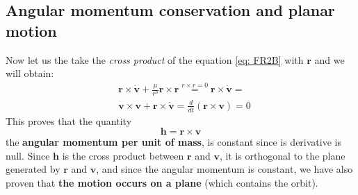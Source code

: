 \subsection{Angular momentum conservation and planar motion}
Now let us the take the \textit{cross product} of the equation \ref{eq: FR2B} with $\mathbf{r}$ and we will obtain:
{\large{
    \begin{align*}
        &\mathbf{r} \times\dot{\mathbf{v}} + 
        \frac{\mu}{r^3}\mathbf{r} \times \mathbf{r} \overset{r\times r=0}{=} 
        \mathbf{r} \times\dot{\mathbf{v}} =\\
        & \mathbf{v} \times \mathbf{v} + \mathbf{r} \times\dot{\mathbf{v}} = \frac{d}{dt} (\mathbf{r} \times\mathbf{v})=0
    \end{align*}
}}
This proves that the quantity
\begin{equation*}
    \mathbf{h} = \mathbf{r} \times\mathbf{v}
\end{equation*}
the \textbf{angular momentum per unit of mass}, is constant since is derivative is null. Since $\mathbf{h}$ is the cross product between $\mathbf{r}$ and $\mathbf{v}$, it is orthogonal to the plane generated by $\mathbf{r}$ and $\mathbf{v}$, and since the angular momentum is constant, we have also proven that \textbf{the motion occurs on a plane} (which contains the orbit).

